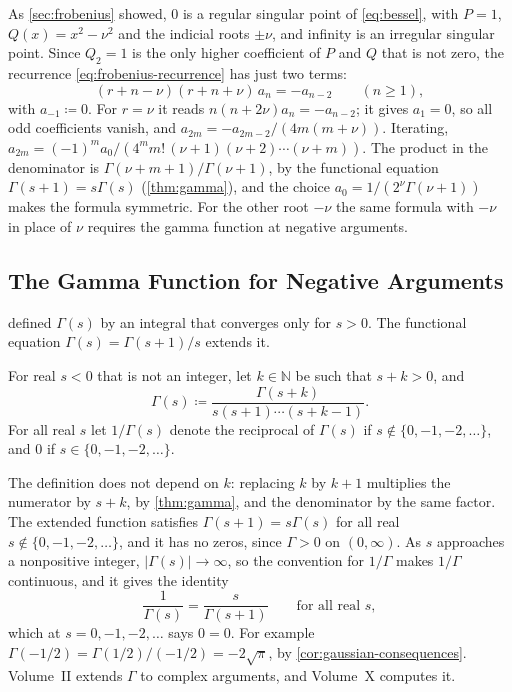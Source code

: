 As \cref{sec:frobenius} showed, $0$ is a regular singular point of \eqref{eq:bessel}, with $P=1$, $Q(x)=x^2-\nu^2$ and the indicial roots $\pm\nu$, and infinity is an irregular singular point. Since $Q_2=1$ is the only higher coefficient of $P$ and $Q$ that is not zero, the recurrence \eqref{eq:frobenius-recurrence} has just two terms:
\[
(r+n-\nu)(r+n+\nu)\,a_n=-a_{n-2}\qquad(n\ge1),
\]
with $a_{-1}\coloneqq0$. For $r=\nu$ it reads $n(n+2\nu)a_n=-a_{n-2}$; it gives $a_1=0$, so all odd coefficients vanish, and $a_{2m}=-a_{2m-2}/(4m(m+\nu))$. Iterating, $a_{2m}=(-1)^ma_0/(4^mm!\,(\nu+1)(\nu+2)\cdots(\nu+m))$. The product in the denominator is $\Gamma(\nu+m+1)/\Gamma(\nu+1)$, by the functional equation $\Gamma(s+1)=s\Gamma(s)$ (\cref{thm:gamma}), and the choice $a_0=1/(2^\nu\Gamma(\nu+1))$ makes the formula symmetric. For the other root $-\nu$ the same formula with $-\nu$ in place of $\nu$ requires the gamma function at negative arguments.

\subsection{The Gamma Function for Negative Arguments}

 defined $\Gamma(s)$ by an integral that converges only for $s>0$. The functional equation $\Gamma(s)=\Gamma(s+1)/s$ extends it.

\begin{definition}
\label{def:gamma-extension}
For real $s<0$ that is not an integer, let $k\in\mathbb N$ be such that $s+k>0$, and
\[
\Gamma(s)\coloneqq\frac{\Gamma(s+k)}{s(s+1)\cdots(s+k-1)} .
\]
For all real $s$ let $1/\Gamma(s)$ denote the reciprocal of $\Gamma(s)$ if $s\notin\{0,-1,-2,\ldots\}$, and $0$ if $s\in\{0,-1,-2,\ldots\}$.
\end{definition}

The definition does not depend on $k$: replacing $k$ by $k+1$ multiplies the numerator by $s+k$, by \cref{thm:gamma}, and the denominator by the same factor. The extended function satisfies $\Gamma(s+1)=s\Gamma(s)$ for all real $s\notin\{0,-1,-2,\ldots\}$, and it has no zeros, since $\Gamma>0$ on $(0,\infty)$. As $s$ approaches a nonpositive integer, $|\Gamma(s)|\to\infty$, so the convention for $1/\Gamma$ makes $1/\Gamma$ continuous, and it gives the identity
\begin{equation}
\frac1{\Gamma(s)}=\frac s{\Gamma(s+1)}\qquad\text{for all real }s,
\label{eq:rgamma}
\end{equation}
which at $s=0,-1,-2,\ldots$ says $0=0$. For example $\Gamma(-1/2)=\Gamma(1/2)/(-1/2)=-2\sqrt\pi$, by \cref{cor:gaussian-consequences}. Volume~II extends $\Gamma$ to complex arguments, and Volume~X computes it.

